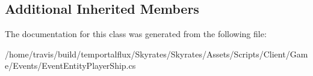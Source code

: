 \subsection*{Additional Inherited Members}


The documentation for this class was generated from the following file\-:\begin{DoxyCompactItemize}
\item 
/home/travis/build/temportalflux/\-Skyrates/\-Skyrates/\-Assets/\-Scripts/\-Client/\-Game/\-Events/Event\-Entity\-Player\-Ship.\-cs\end{DoxyCompactItemize}
